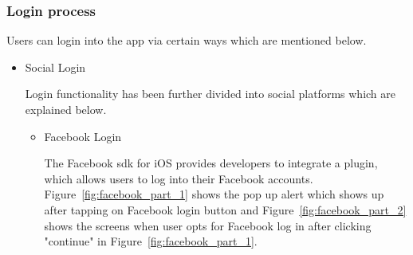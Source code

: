 \subsubsection{Login process}

Users can login into the app via certain ways which are mentioned below.

\begin{itemize}
    \item Social Login
    
    Login functionality has been further divided into social platforms which are explained below.
    
    \begin{itemize}
        \item Facebook Login
        
       The Facebook \gls{sdk} for \gls{iOS} provides developers to integrate a plugin, which allows users to log into their Facebook accounts. Figure~\ref{fig:facebook_part_1} shows the pop up alert which shows up after tapping on Facebook login button and Figure~\ref{fig:facebook_part_2} shows the screens when user opts for Facebook log in after clicking "continue" in Figure~\ref{fig:facebook_part_1}.
       

\end{itemize}
\end{itemize}
